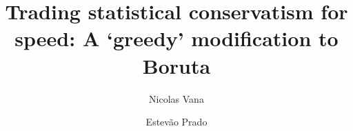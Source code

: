 \documentclass[runningheads]{llncs}
\begin{document}
\title{Trading statistical conservatism for speed: A `greedy' modification to Boruta}



\author{Nicolas Vana \and Estevão Prado}

\maketitle

\end{document}
